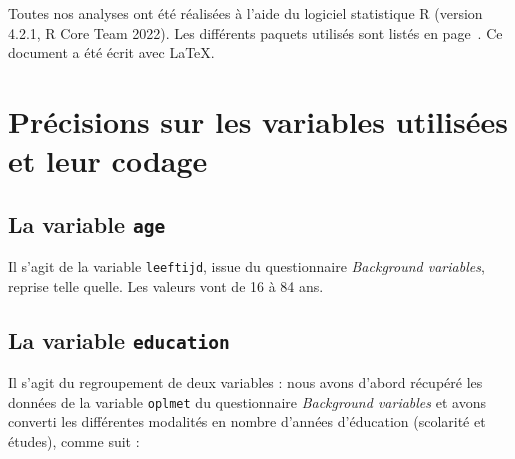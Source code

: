 \documentclass[a4paper, french, 11 pt]{article}\usepackage[]{graphicx}\usepackage[]{xcolor}
\begin{document}
\vspace{0,3cm}

Toutes nos analyses ont été réalisées à l'aide du logiciel statistique R (version 4.2.1, R Core Team 2022). Les différents paquets utilisés sont listés en page~\pageref{sec:ref}. Ce document a été écrit avec \LaTeX. 

\nocite{*}
\printbibliography[notkeyword={Rsoftware}, title={Bibliographie}]

\printbibliography[keyword={Rsoftware}, title={Logiciels et paquets}]
\label{sec:ref}

\appendix
\appendixpage
\addappheadtotoc

\section{Précisions sur les variables utilisées et leur codage}

\subsection{La variable \texttt{age}}

Il s’agit de la variable \texttt{leeftijd}, issue du questionnaire \textit{Background variables}, reprise telle quelle. Les valeurs vont de 16 à 84 ans. 

\subsection{La variable \texttt{education}}

Il s'agit du regroupement de deux variables : nous avons d'abord récupéré les données de la variable \texttt{oplmet} du questionnaire \textit{Background variables} et avons converti les différentes modalités en nombre d'années d'éducation (scolarité et études), comme suit : 
\end{document}
